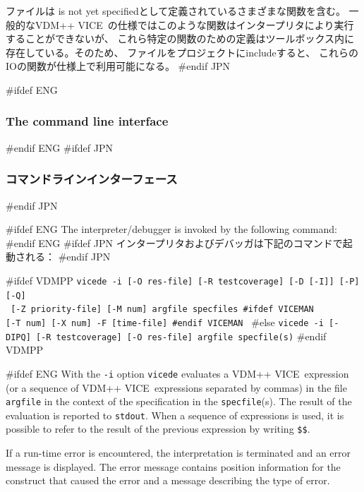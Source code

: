 \documentclass[\pformat,12pt]{article}
\newcommand{\vdmslpp}{VDM-SL}
\newcommand{\vdmde}{vdmde}
\newcommand{\vdmslpp}{VDM++}
\newcommand{\vdmde}{vppde}
\renewcommand{\vdmslpp}{VDM++ VICE}
\renewcommand{\vdmde}{vicede}
\newcommand{\aaa}{\tt }
\newcommand{\keyw}[1]{{\sf #1}}
\begin{document}
ファイルは
\keyw{is not yet specified}として定義されているさまざまな関数を含む。
一般的な\vdmslpp\ の仕様ではこのような関数はインタープリタにより実行することができないが、
これら特定の関数のための定義はツールボックス内に存在している。そのため、
ファイルをプロジェクトにincludeすると、
これらのIOの関数が仕様上で利用可能になる。
#endif JPN

#ifdef ENG
\subsubsection{The command line interface}\label{subsec:intercom}
#endif ENG
#ifdef JPN
\subsubsection{コマンドラインインターフェース}\label{subsec:intercom}
#endif JPN

#ifdef ENG
The interpreter/debugger is invoked by the following command:
#endif ENG
#ifdef JPN
インタープリタおよびデバッガは下記のコマンドで起動される：
#endif JPN

#ifdef VDMPP
  {\tt \vdmde\ -i [-O res-file] [-R testcoverage] [-D [-I]] [-P] [-Q]}\\
  {\tt \mbox{\hspace{4em}} [-Z priority-file] [-M num] argfile specfiles
#ifdef VICEMAN
  \\
  \mbox{\hspace{4em}} [-T num] [-X num] -F [time-file]
#endif VICEMAN
  }
#else
  {\tt \vdmde\ -i [-DIPQ] [-R testcoverage] [-O res-file] argfile specfile(s)}
#endif VDMPP

\vspace{0.5cm}

#ifdef ENG
\noindent
With the {\tt -i} option {\tt \vdmde}\index{\vdmde\!command line
  options} evaluates a \vdmslpp\ expression (or a sequence of
\vdmslpp\ expressions separated by commas) in the file {\tt argfile} in the
context of the specification in the {\tt specfile}(s). The result of
the evaluation is reported to {\aaa stdout}.
When a sequence of
expressions is used, it is possible to refer to the result of the
previous expression by writing {\tt \$\$}.\index{\$\$}

If a run-time error is encountered, the interpretation is terminated
and an error message is displayed. The error message contains position
information for the construct that caused the error and a message
describing the type of error.
\end{document}
